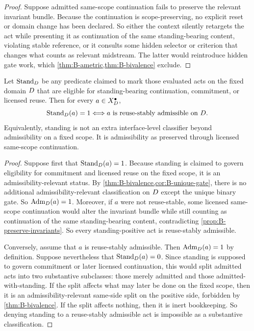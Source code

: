 \begin{proof}
Suppose admitted same-scope continuation fails to preserve the relevant invariant bundle. Because the continuation is scope-preserving, no explicit reset or domain change has been declared. So either the context silently retargets the act while presenting it as continuation of the same standing-bearing content, violating stable reference, or it consults some hidden selector or criterion that changes what counts as relevant midstream. The latter would reintroduce hidden gate work, which \cref{thm:B-ametric,thm:B-bivalence} exclude.
\end{proof}

\begin{theorem}
\label{thm:B-standing}
Let $\mathrm{Stand}_D$ be any predicate claimed to mark those evaluated acts on the fixed domain $D$ that are eligible for standing-bearing continuation, commitment, or licensed reuse. Then for every $a\in X_D^{\bullet}$,
\[
\mathrm{Stand}_D(a)=1 \Longleftrightarrow a \text{ is reuse-stably admissible on } D.
\]
Equivalently, standing is not an extra interface-level classifier beyond admissibility on a fixed scope. It is admissibility as preserved through licensed same-scope continuation.
\end{theorem}

\begin{proof}
Suppose first that $\mathrm{Stand}_D(a)=1$. Because standing is claimed to govern eligibility for commitment and licensed reuse on the fixed scope, it is an admissibility-relevant status. By \cref{thm:B-bivalence,cor:B-unique-gate}, there is no additional admissibility-relevant classification on $D$ except the unique binary gate. So $\mathrm{Adm}_D(a)=1$. Moreover, if $a$ were not reuse-stable, some licensed same-scope continuation would alter the invariant bundle while still counting as continuation of the same standing-bearing content, contradicting \cref{prop:B-preserve-invariants}. So every standing-positive act is reuse-stably admissible.

Conversely, assume that $a$ is reuse-stably admissible. Then $\mathrm{Adm}_D(a)=1$ by definition. Suppose nevertheless that $\mathrm{Stand}_D(a)=0$. Since standing is supposed to govern commitment or later licensed continuation, this would split admitted acts into two substantive subclasses: those merely admitted and those admitted-with-standing. If the split affects what may later be done on the fixed scope, then it is an admissibility-relevant same-side split on the positive side, forbidden by \cref{thm:B-bivalence}. If the split affects nothing, then it is inert bookkeeping. So denying standing to a reuse-stably admissible act is impossible as a substantive classification.
\end{proof}


